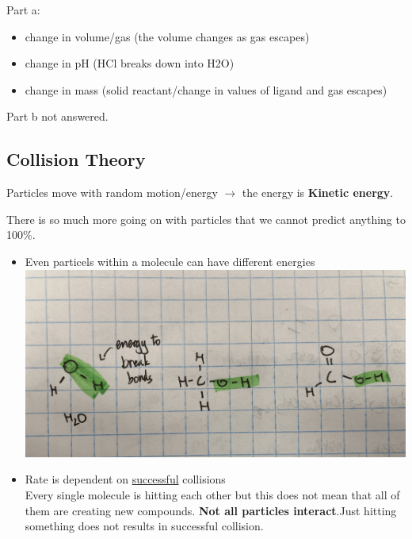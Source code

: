 \documentclass{article}
\begin{document}
Part a:
\begin{itemize}
\item change in volume/gas (the volume changes as gas escapes)
\item change in pH (HCl breaks down into H2O)
\item change in mass (solid reactant/change in values of ligand and gas escapes)
\end{itemize}

Part b not answered.

\subsection{Collision Theory}
Particles move with random motion/energy $\rightarrow$ the energy is \textbf{Kinetic energy}.

There is so much more going on with particles that we cannot predict anything to 100\%.
\begin{itemize}
\item Even particels within a molecule can have different energies\\ \includegraphics[width=\textwidth]{1.3fig1.png}
\item Rate is dependent on \underline{successful} collisions\\Every single molecule is hitting each other but this does not mean that all of them are creating new compounds. \textbf{Not all particles interact}.Just hitting something does not results in successful collision. 
\end{itemize}

\pagebreak
\end{document}
